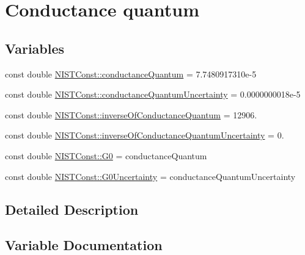 \hypertarget{group___conductance_quantum}{}\section{Conductance quantum}
\label{group___conductance_quantum}
\subsection*{Variables}
\begin{DoxyCompactItemize}
\item 
const double \hyperlink{group___conductance_quantum_gac57088a56b37d0b899d3e9c9babaadaf}{N\+I\+S\+T\+Const\+::conductance\+Quantum} = 7.\+7480917310e-\/5
\item 
const double \hyperlink{group___conductance_quantum_ga599b808b8a742da1bb97cdb68f65cbf9}{N\+I\+S\+T\+Const\+::conductance\+Quantum\+Uncertainty} = 0.\+0000000018e-\/5
\item 
const double \hyperlink{group___conductance_quantum_ga39f726a47f146a434d7fca49fc2aeb30}{N\+I\+S\+T\+Const\+::inverse\+Of\+Conductance\+Quantum} = 12906.
\item 
const double \hyperlink{group___conductance_quantum_ga952c117f8b62615110f13d95c70075cd}{N\+I\+S\+T\+Const\+::inverse\+Of\+Conductance\+Quantum\+Uncertainty} = 0.
\item 
const double \hyperlink{group___conductance_quantum_ga04bee7105fe6a217430a2db2913e7754}{N\+I\+S\+T\+Const\+::\+G0} = conductance\+Quantum
\item 
const double \hyperlink{group___conductance_quantum_gab513ebf6083eb652771a17515e895301}{N\+I\+S\+T\+Const\+::\+G0\+Uncertainty} = conductance\+Quantum\+Uncertainty
\end{DoxyCompactItemize}


\subsection{Detailed Description}


\subsection{Variable Documentation}
\mbox{\label{group___conductance_quantum_gac57088a56b37d0b899d3e9c9babaadaf}} 
